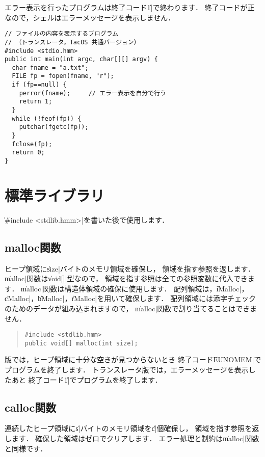エラー表示を行ったプログラムは終了コード\|1|で終わります．
終了コードが正なので，シェルはエラーメッセージを表示しません．

\begin{mylist}
\begin{verbatim}
// ファイルの内容を表示するプログラム
// （トランスレータ，TacOS 共通バージョン）
#include <stdio.hmm>
public int main(int argc, char[][] argv) {
  char fname = "a.txt";
  FILE fp = fopen(fname, "r");
  if (fp==null) {
    perror(fname);     // エラー表示を自分で行う
    return 1;
  }
  while (!feof(fp)) {
    putchar(fgetc(fp));
  }
  fclose(fp);
  return 0;
}
\end{verbatim}
\end{mylist}

\section{標準ライブラリ}

\|#include <stdlib.hmm>|を書いた後で使用します．

\subsection{malloc関数}

ヒープ領域に\|size|バイトのメモリ領域を確保し，
領域を指す参照を返します．
\|malloc|関数は\|void[]|型なので，
領域を指す参照は全ての参照変数に代入できます．
\|malloc|関数は構造体領域の確保に使用します．
配列領域は，\|iMalloc|，\|cMalloc|，\|bMalloc|，\|rMalloc|を用いて確保します．
配列領域には添字チェックのためのデータが組み込まれますので，
\|malloc|関数で割り当てることはできません．

\begin{quote}
\begin{verbatim}
#include <stdlib.hmm>
public void[] malloc(int size);
\end{verbatim}
\end{quote}

{\tacos}版では，ヒープ領域に十分な空きが見つからないとき
終了コード\|EUNOMEM|でプログラムを終了します．
トランスレータ版では，エラーメッセージを表示したあと
終了コード\|1|でプログラムを終了します．

\subsection{calloc関数}

連続したヒープ領域に\|s|バイトのメモリ領域を\|c|個確保し，
領域を指す参照を返します．
確保した領域はゼロでクリアします．
エラー処理と制約は\|malloc|関数と同様です．

